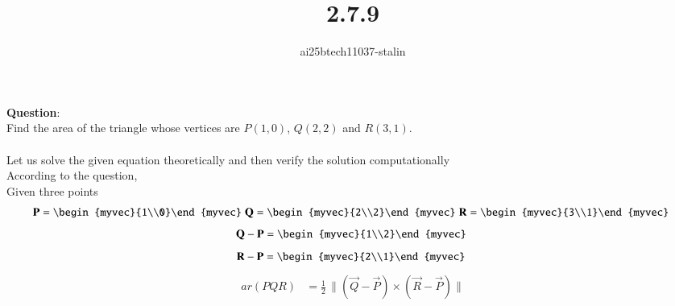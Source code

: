 \documentclass[journal]{IEEEtran}
\begin{document}

\vspace{3cm}

\title{2.7.9}
\author{ai25btech11037-stalin}
 \maketitle
{\let\newpage\relax\maketitle}
\renewcommand{\thefigure}{\theenumi}
\renewcommand{\thetable}{\theenumi}
\setlength{\intextsep}{10pt} %
\renewcommand{\thetable}{\theenumi}
\textbf{Question}:\\
Find the area of the triangle whose vertices are $P(1,0)$, $Q(2,2)$ and $R(3,1)$.\\
\solution \\
Let us solve the given equation theoretically and then verify the solution computationally \\
According to the question, \\
Given three points\\
\begin{align}
  \vec{P}=\begin{myvec}{1\\0}\end{myvec}\;
  \vec{Q}=\begin{myvec}{2\\2}\end{myvec}\;
  \vec{R}=\begin{myvec}{3\\1}\end{myvec}\
   \end{align}
   \begin{align}
 \vec{Q}-\vec{P}=\begin{myvec}{1\\2}\end{myvec}\
\end{align}
\begin{align}
  \vec{R}-\vec{P}=\begin{myvec}{2\\1}\end{myvec}\
\end{align}
\begin{align}
ar(PQR) &= \frac{1}{2} \, \|(\vec{Q} - \vec{P}) \times (\vec{R} - \vec{P}) \|
\end{align}
\end{document}
